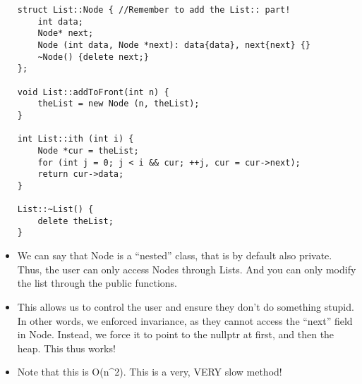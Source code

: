 \documentclass{article}
\begin{document}
\begin{itemize}
\begin{lstlisting}
struct List::Node { //Remember to add the List:: part!
    int data;
    Node* next;
    Node (int data, Node *next): data{data}, next{next} {}
    ~Node() {delete next;}
};

void List::addToFront(int n) {
    theList = new Node (n, theList);
}

int List::ith (int i) {
    Node *cur = theList;
    for (int j = 0; j < i && cur; ++j, cur = cur->next);
    return cur->data;
}

List::~List() {
    delete theList;
}
\end{lstlisting}
\item We can say that Node is a ``nested'' class, that is by default also private.  Thus, the user can only access Nodes through Lists.  And you can only modify the list through the public functions.
\item This allows us to control the user and ensure they don't do something stupid.  In other words, we enforced invariance, as they cannot access the ``next'' field in Node.  Instead, we force it to point to the nullptr at first, and then the heap.  This thus works!
\item Note that this is O(n^2).  This is a very, VERY slow method!  
\end{itemize}
\end{document}
